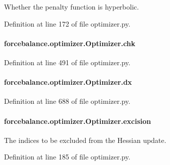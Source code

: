 Whether the penalty function is hyperbolic. 



Definition at line 172 of file optimizer.\-py.

\hypertarget{classforcebalance_1_1optimizer_1_1Optimizer_aab04585adf73123d3187aa7dd22e7ce2}{
\paragraph[{chk}]{\setlength{\rightskip}{0pt plus 5cm}forcebalance.\-optimizer.\-Optimizer.\-chk}}\label{classforcebalance_1_1optimizer_1_1Optimizer_aab04585adf73123d3187aa7dd22e7ce2}


Definition at line 491 of file optimizer.\-py.

\hypertarget{classforcebalance_1_1optimizer_1_1Optimizer_aaa9b39385a4d067aec12a595da09cc16}{
\paragraph[{dx}]{\setlength{\rightskip}{0pt plus 5cm}forcebalance.\-optimizer.\-Optimizer.\-dx}}\label{classforcebalance_1_1optimizer_1_1Optimizer_aaa9b39385a4d067aec12a595da09cc16}


Definition at line 688 of file optimizer.\-py.

\hypertarget{classforcebalance_1_1optimizer_1_1Optimizer_a1040c03a6361d782db8bd6a273d445e5}{
\paragraph[{excision}]{\setlength{\rightskip}{0pt plus 5cm}forcebalance.\-optimizer.\-Optimizer.\-excision}}\label{classforcebalance_1_1optimizer_1_1Optimizer_a1040c03a6361d782db8bd6a273d445e5}


The indices to be excluded from the Hessian update. 



Definition at line 185 of file optimizer.\-py.

